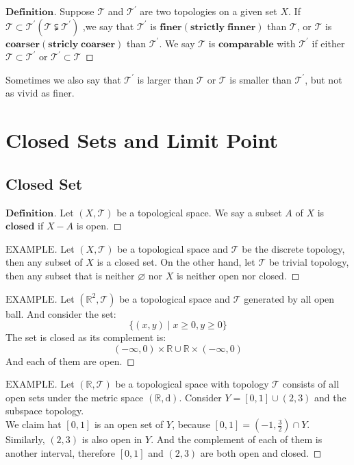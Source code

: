 \documentclass[a4paper, 11pt]{article}
\theoremstyle{remark}
\newenvironment{mydef}
{\renewcommand\qedsymbol{$ $}\begin{proof}[$\mathbf{Definition}$]}
  {\end{proof}}
\newenvironment{myexam}
{\renewcommand\qedsymbol{$ $}\begin{proof}[$\mathrm{EXAMPLE}$]}
  {\end{proof}}
\theoremstyle{definition}
\begin{document}
\vspace{0.5cm}
\begin{mydef}
        Suppose $\mathcal{T}$ and $\mathcal{T}^{'}$ are two topologies on a given set
        $X$. If $\mathcal{T}\subset\mathcal{T}^{'}(\mathcal{T}\subsetneqq\mathcal{T}^{'})$
        ,we say that $\mathcal{T}^{'}$ is  
        $\bm{finer}(\bm{strictly\;finner})$ than $\mathcal{T}$, or $\mathcal{T}$ is 
        $\bm{coarser}(\bm{stricly\;coarser})$ than $\mathcal{T}^{'}$. We say
        $\mathcal{T}$ is $\bm{comparable}$ with $\mathcal{T}^{'}$ if either
        $\mathcal{T}\subset \mathcal{T}^{'}$ or $\mathcal{T}^{'}\subset \mathcal{T}$
\end{mydef}
Sometimes we also say that $\mathcal{T}^{'}$ is larger than $\mathcal{T}$ or $\mathcal{T}$
is smaller than $\mathcal{T}^{'}$, but not as vivid as finer.

\section{Closed Sets and Limit Point}
\subsection{Closed Set}
\begin{mydef}
        Let $(X,\mathcal{T})$ be a topological space. We say a subset $A$ of $X$ is 
        $\bm{closed}$ if $X-A$ is open.
\end{mydef}

\begin{myexam}
        Let $(X,\mathcal{T})$ be a topological space and $\mathcal{T}$ be the discrete 
        topology, then any subset of $X$ is a closed set. On the other hand, let
        $\mathcal{T}$ be trivial topology, then any subset that is neither $\varnothing$
        nor $X$ is neither open nor closed.
\end{myexam}

\begin{myexam}
        Let $(\mathbb{R}^{2},\mathcal{T})$ be a topological space and $\mathcal{T}$ 
        generated by all open ball. And consider the set:
        $$
        \{(x,y)\mid x\ge 0,y\ge 0\}
        $$The set is closed as its complement is:
        $$
        (-\infty,0)\times \mathbb{R}\cup \mathbb{R}\times(-\infty,0)
        $$ And each of them are open.
\end{myexam}

\begin{myexam}
        Let $(\mathbb{R}, \mathcal{T})$ be a topological space with topology $\mathcal{T}$
        consists of all open sets under the metric space $(\mathbb{R}, \mathrm{d})$.
        Consider $Y=[0,1]\cup(2,3)$ and the subspace topology.\\
        We claim hat $[0,1]$ is an open set of $Y$, because $[0,1]=(-1,\frac{3}{2})\cap
        Y$. Similarly, $(2,3)$ is also open in $Y$. And the complement of each of them is
        another interval, therefore $[0,1]$ and $(2,3)$ are both open and closed.
\end{myexam}
\end{document}
